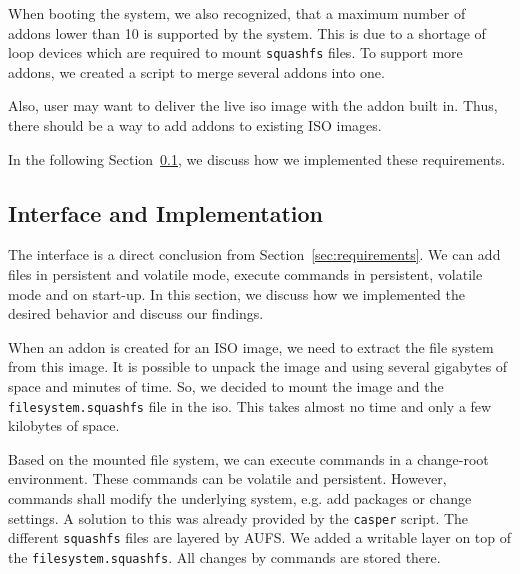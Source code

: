 \documentclass[english]{lni}
\begin{document}
When booting the system, we also recognized, that a maximum number of addons lower than 10 is supported by the system.
This is due to a shortage of loop devices which are required to mount \texttt{squashfs} files.
To support more addons, we created a script to merge several addons into one.

Also, user may want to deliver the live iso image with the addon built in.
Thus, there should be a way to add addons to existing ISO images.

In the following Section~\ref{sec:implementation}, we discuss how we implemented these requirements.

\subsection{Interface and Implementation}
\label{sec:implementation}

The interface is a direct conclusion from Section~\ref{sec:requirements}.
We can add files in persistent and volatile mode, execute commands in persistent, volatile mode and on start-up.
In this section, we discuss how we implemented the desired behavior and discuss our findings.

When an addon is created for an ISO image, we need to extract the file system from this image.
It is possible to unpack the image and using several gigabytes of space and minutes of time.
So, we decided to mount the image and the \texttt{filesystem.squashfs} file in the iso.
This takes almost no time and only a few kilobytes of space.

Based on the mounted file system, we can execute commands in a change-root environment.
These commands can be volatile and persistent. %
However, commands shall modify the underlying system, e.g. add packages or change settings.
A solution to this was already provided by the \texttt{casper} script.
The different \texttt{squashfs} files are layered by AUFS. %
We added a writable layer on top of the \texttt{filesystem.squashfs}.
All changes by commands are stored there.
\end{document}
